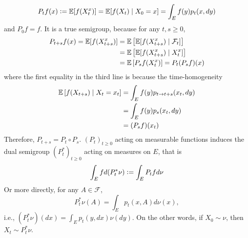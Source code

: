 \begin{enumerate}[label=\arabic{*}.]
	\begin{equation*}
	    P_tf(x) \vcentcolon= \mathbb{E}[f(X_t^x)] = \mathbb{E}[f(X_t) \mid X_0 =x] = \int_E f(y)p_t(x,dy)
	\end{equation*}
	and $P_0f=f$. It is a true semigroup, because for any $t,s \geq 0$,
	\begin{equation*}
	    \begin{aligned}
	    	P_{t+s}f(x) = \mathbb{E}[f(X_{t+s}^x)] &= \mathbb{E}\left[\mathbb{E}[f(X_{t+s}^x) \mid \mathcal{F}_t]\right] \\
	    	&= \mathbb{E}\left[\mathbb{E}[f(X_{t+s}^x) \mid X_t^x]\right]\\
	    	&= \mathbb{E}\left[P_sf(X_t^x)\right] = P_t(P_sf)(x)
	    \end{aligned}
	\end{equation*}
	where the first equality in the third line is because the time-homogeneity
	\begin{equation*}
	    \begin{aligned}
	    	\mathbb{E}\left[f(X_{t+s}) \mid X_t = x_t\right] &= \int_E f(y)p_{t \rightarrow t+s}(x_t,dy) \\
	    	&= \int_E f(y)p_s(x_t,dy) \\
	    	&= (P_sf)(x_t)
	    \end{aligned}
	\end{equation*}
	Therefore, $P_{t+s} = P_t \circ P_s$. $(P_t)_{t \geq 0}$ acting on measurable functions induces the dual semigroup $(P_t^*)_{t \geq 0}$ acting on measures on $E$, that is
	\begin{equation*}
	    \int_E f d(P_t^*\nu) \vcentcolon= \int_E P_tf d\nu
	\end{equation*}
	Or more directly, for any $A \in \mathcal{F}$,
	\begin{equation*}
	    P_t^*\nu(A) = \int_E p_t(x,A)d\nu(x),
	\end{equation*}
	i.e., $(P_t^*\nu)(dx) = \int_E p_t(y,dx)\nu(dy)$. On the other words, if $X_0 \sim \nu$, then $X_t \sim P_t^*\nu$.


\end{enumerate}
